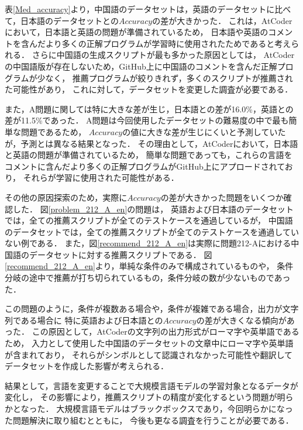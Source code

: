  表\ref{Med_accuracy}より，中国語のデータセットは，英語のデータセットに比べて，日本語のデータセットとの$Accuracy$の差が大きかった．
  これは，AtCoder\cite{AtCoder}において，日本語と英語の問題が準備されているため，
  日本語や英語のコメントを含んだより多くの正解プログラムが学習時に使用されたためであると考えられる．
  さらに中国語の生成スクリプトが最も多かった原因としては，
  AtCoderの中国語版が存在しないため，GitHub上に中国語のコメントを含んだ正解プログラムが少なく，
  推薦プログラムが絞りきれず，多くのスクリプトが推薦された可能性があり，
  これに対して，データセットを変更した調査が必要である．
  
  また，A問題に関しては特に大きな差が生じ，日本語との差が16.0\%，英語との差が11.5\%であった．
  A問題は今回使用したデータセットの難易度の中で最も簡単な問題であるため，
  $Accuracy$の値に大きな差が生じにくいと予測していたが，予測とは異なる結果となった．
  その理由として，AtCoder\cite{AtCoder}において，日本語と英語の問題が準備されているため，
  簡単な問題であっても，これらの言語をコメントに含んだより多くの正解プログラムがGitHub上にアプロードされており，
  それらが学習に使用された可能性がある．
  
  その他の原因探索のため，実際に$Accuracy$の差が大きかった問題をいくつか確認した．
  図\ref{problem_212_A_en}の問題は，
  英語および日本語のデータセットでは，全ての推薦スクリプトが全てのテストケースを通過しているが，
  中国語のデータセットでは，全ての推薦スクリプトが全てのテストケースを通過していない例である．
  また，図\ref{recommend_212_A_en}は実際に問題212-Aにおける中国語のデータセットに対する推薦スクリプトである．
  図\ref{recommend_212_A_en}より，単純な条件のみで構成されているものや，
  条件分岐の途中で推薦が打ち切られているもの，条件分岐の数が少ないものであった．
  
  この問題のように，条件が複数ある場合や，条件が複雑である場合，出力が文字列である場合に
  特に英語および日本語との$Accuracy$の差が大きくなる傾向があった．
  この原因として，AtCoderの文字列の出力形式がローマ字や英単語であるため，
  入力として使用した中国語のデータセットの文章中にローマ字や英単語が含まれており，
  それらがシンボルとして認識されなかった可能性や翻訳してデータセットを作成した影響が考えられる．

  結果として，言語を変更することで大規模言語モデルの学習対象となるデータが変化し，
  その影響により，推薦スクリプトの精度が変化するという問題が明らかとなった．
  大規模言語モデルはブラックボックスであり，今回明らかになった問題解決に取り組むとともに，
  今後も更なる調査を行うことが必要である．